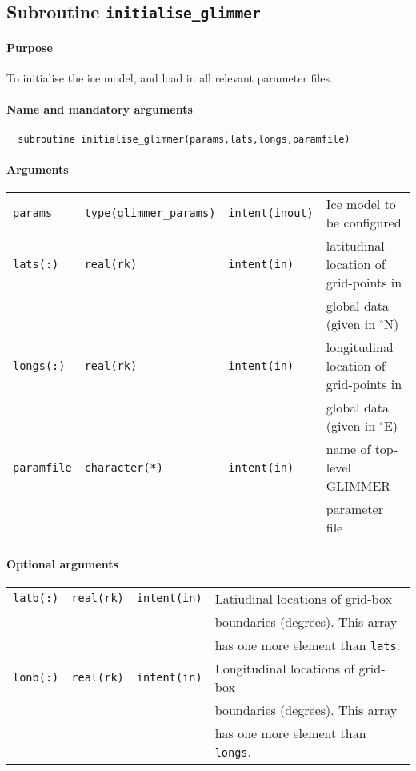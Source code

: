 \documentclass[11pt]{article}
\begin{document}
\subsection{Subroutine \texttt{initialise\_glimmer}}
%
\paragraph{Purpose} To initialise the ice model, and load in all relevant parameter files.
%
\paragraph{Name and mandatory arguments}
%
\begin{verbatim}
  subroutine initialise_glimmer(params,lats,longs,paramfile)
\end{verbatim}
%
\paragraph{Arguments}
%
\begin{center}
\begin{tabular}{llll}
\texttt{params}    & \texttt{type(glimmer\_params)} & \texttt{intent(inout)} &
Ice model to be configured \\
\texttt{lats(:)}   & \texttt{real(rk)} & \texttt{intent(in)} & latitudinal location of grid-points in \\
 & & & global data (given in $^{\circ}\mathrm{N}$)\\
\texttt{longs(:)}  & \texttt{real(rk)} & \texttt{intent(in)} & longitudinal location of grid-points in \\
 & & & global data (given in $^{\circ}\mathrm{E}$)\\
\texttt{paramfile} & \texttt{character(*)} & \texttt{intent(in)} & name of
top-level GLIMMER \\
 & & & parameter file \\
\end{tabular}
\end{center}
%
\paragraph{Optional arguments}
%
\begin{center}
\begin{tabular}{llll}
\texttt{latb(:)} & \texttt{real(rk)} & \texttt{intent(in)} & Latiudinal
locations of grid-box \\
 & & & boundaries (degrees). This array \\
 & & & has one more element than \texttt{lats}. \\
\texttt{lonb(:)} & \texttt{real(rk)} & \texttt{intent(in)} & Longitudinal
locations of grid-box \\
 & & & boundaries (degrees). This array \\
 & & & has one more element than \texttt{longs}. \\
\end{tabular}
\end{center}
\end{document}
